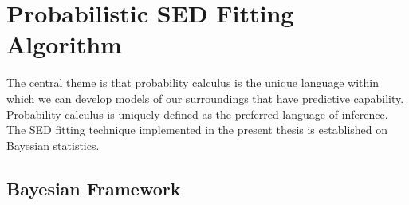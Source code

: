 \chapter{Probabilistic SED Fitting Algorithm} \label{chp:Algorithm}
\captionsetup{width=0.75\textwidth}


The central theme is that probability calculus is the unique language within which we can develop models of our surroundings that have predictive capability. Probability calculus is uniquely defined\cite{Skilling2005} as the preferred language of inference.
The SED fitting technique implemented in the present thesis is established on Bayesian statistics.



\section{Bayesian Framework}\label{sec:Bayes}

